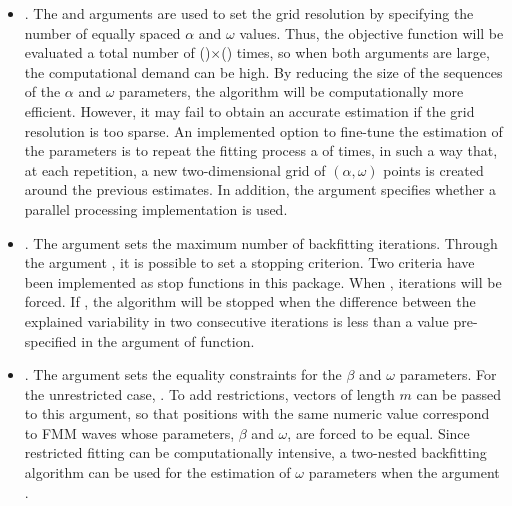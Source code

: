 \begin{itemize}
\item {}. The  and  arguments are used to set the grid resolution by specifying the number of equally spaced $\alpha$ and $\omega$ values. Thus, the objective function will be evaluated a total number of ()$\times$() times, so when both arguments are large, the computational demand can be high. By reducing the size of the sequences of the $\alpha$ and $\omega$ parameters, the algorithm will be computationally more efficient. However, it may fail to obtain an accurate estimation if the grid resolution is too sparse. 
An implemented option to fine-tune the estimation of the parameters is to repeat the fitting process a  of times, in such a way that, at each repetition, a new two-dimensional grid of $\left(\alpha, \omega\right)$ points is created around the previous estimates. In addition, the  argument specifies whether a parallel processing implementation is used. 

\item {}. The argument  sets the maximum number of backfitting iterations. Through the argument , it is possible to set a stopping criterion. Two criteria have been implemented as stop functions in this package. When ,  iterations will be forced. If , the algorithm will be stopped when the difference between the explained variability in two consecutive iterations is less than a value pre-specified in the  argument of  function. 

\item {}. The argument  sets the equality constraints for the $\beta$ and $\omega$ parameters. For the unrestricted case, . To add restrictions,  vectors of length $m$ can be passed to this argument, so that positions with the same numeric value correspond to FMM waves whose parameters, $\beta$ and $\omega$, are forced to be equal. Since restricted fitting can be computationally intensive, a two-nested backfitting algorithm can be used for the estimation of $\omega$ parameters when the argument . 
\end{itemize}

